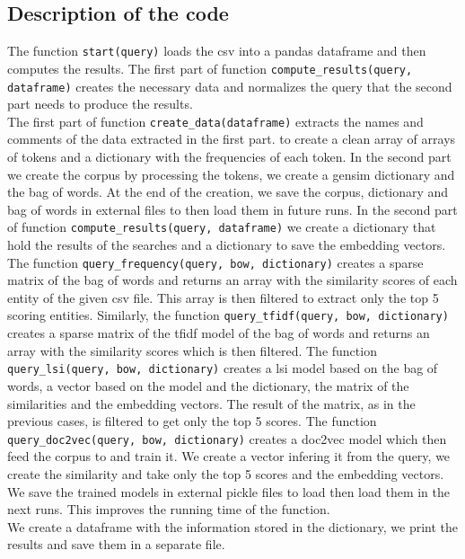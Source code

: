 \documentclass [14 pt]{article}
\begin{document}
\subsection{Description of the code} %
The function \texttt{start(query)} loads the csv into a pandas dataframe and then computes the results.
The first part of function \texttt{compute\_results(query, dataframe)} creates the necessary data and normalizes the query that the second part needs to produce the results.\\
The first part of function \texttt{create\_data(dataframe)} extracts the names and comments of the data extracted in the first part. to create a clean array of arrays of tokens and a dictionary with the frequencies of each token. In the second part we create the corpus by processing the tokens, we create a gensim dictionary and the bag of words. At the end of the creation, we save the corpus, dictionary and bag of words in external files to then load them in future runs.
In the second part of function \texttt{compute\_results(query, dataframe)} we create a dictionary that hold the results of the searches and a dictionary to save the embedding vectors. \\
The function \texttt{query\_frequency(query, bow, dictionary)} creates a sparse matrix of the bag of words and returns an array with the similarity scores of each entity of the given csv file. This array is then filtered to extract only the top 5 scoring entities.
Similarly, the function \texttt{query\_tfidf(query, bow, dictionary)} creates a sparse matrix of the tfidf model of the bag of words and returns an array with the similarity scores which is then filtered.
The function \texttt{query\_lsi(query, bow, dictionary)} creates a lsi model based on the bag of words, a vector based on the model and the dictionary, the matrix of the similarities and the embedding vectors. The result of the matrix, as in the previous cases, is filtered to get only the top 5 scores.
The function \texttt{query\_doc2vec(query, bow, dictionary)} creates a doc2vec model which then feed the corpus to and train it. We create a vector infering it from the query, we create the similarity and take only the top 5 scores and the embedding vectors.\\
We save the trained models in external pickle files to load then load them in the next runs. This improves the running time of the function.\\
We create a dataframe with the information stored in the dictionary, we print the results and save them in a separate file.
\end{document}
